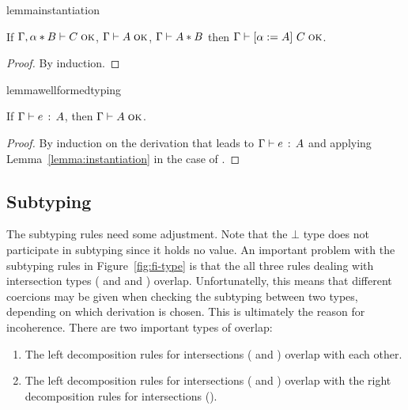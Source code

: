 \begin{restatable}[Instantiation]{lemma}{instantiation}
  \label{lemma:instantiation}

  If $\Gamma, \alpha * B \vdash C \; \textsc{ok}$, $\Gamma \vdash A \; \textsc{ok}$, $\Gamma \vdash A * B$
  then $\Gamma \vdash \lbrack \alpha := A \rbrack~ C \; \textsc{ok}$.
\end{restatable}

\begin{proof}
  By induction.
\end{proof}

\begin{restatable}{lemma}{wellformedtyping}
  \label{lemma:wellformed-typing}

  If $\Gamma \vdash e \ \!:\! \ A$, then $\Gamma \vdash A \; \textsc{ok}$.
\end{restatable}

\begin{proof}
  By induction on the derivation that leads to $\Gamma \vdash e \ \!:\! \ A$ and applying
  Lemma~\ref{lemma:instantiation} in the case of .
\end{proof}

\subsection{Subtyping}


The subtyping rules need some adjustment.
Note that the $\bot$ type does not participate in subtyping since it holds no value.
An important
problem with the subtyping rules in Figure~\ref{fig:fi-type} is that the all three rules
dealing with intersection types
( and  and )
overlap. Unfortunatelly,
this means that different coercions may be given when checking the subtyping
between two types, depending on which derivation is chosen. This is ultimately the reason
for incoherence.
There are two important types of overlap:

\begin{enumerate}

\item The left decomposition rules for intersections ( and ) overlap with each other.

\item The left decomposition rules for intersections ( and )
overlap with the right decomposition rules for intersections ().

\end{enumerate}

